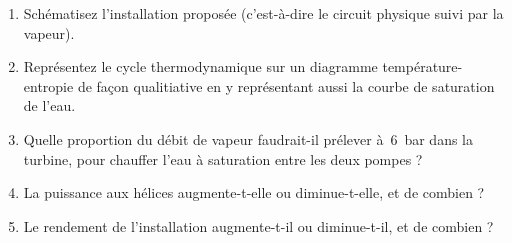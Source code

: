 	\begin{enumerate}	
		\item Schématisez l’installation proposée (c’est-à-dire le circuit physique suivi par la vapeur).
		\item Représentez le cycle thermodynamique sur un diagramme température-entropie de façon qualitiative en y représentant aussi la courbe de saturation de l’eau.
		\item Quelle proportion du débit de vapeur faudrait-il prélever à~\SI{6}{\bar} dans la turbine, pour chauffer l’eau à saturation entre les deux pompes ?
		\item La puissance aux hélices augmente-t-elle ou diminue-t-elle, et de combien ?
		\item Le rendement de l’installation augmente-t-il ou diminue-t-il, et de combien ?
	\end{enumerate}

\exercisesolutionpage
\titreresultats
	

